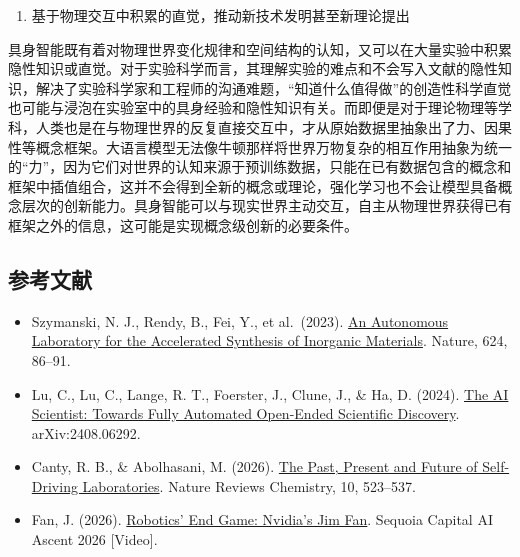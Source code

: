 \begin{enumerate}
\def\labelenumi{\arabic{enumi}.}
\setcounter{enumi}{3}
\tightlist
\item
  基于物理交互中积累的直觉，推动新技术发明甚至新理论提出
\end{enumerate}

具身智能既有着对物理世界变化规律和空间结构的认知，又可以在大量实验中积累隐性知识或直觉。对于实验科学而言，其理解实验的难点和不会写入文献的隐性知识，解决了实验科学家和工程师的沟通难题，``知道什么值得做''的创造性科学直觉也可能与浸泡在实验室中的具身经验和隐性知识有关。而即便是对于理论物理等学科，人类也是在与物理世界的反复直接交互中，才从原始数据里抽象出了力、因果性等概念框架。大语言模型无法像牛顿那样将世界万物复杂的相互作用抽象为统一的``力''，因为它们对世界的认知来源于预训练数据，只能在已有数据包含的概念和框架中插值组合，这并不会得到全新的概念或理论，强化学习也不会让模型具备概念层次的创新能力。具身智能可以与现实世界主动交互，自主从物理世界获得已有框架之外的信息，这可能是实现概念级创新的必要条件。

\hypertarget{ux53c2ux8003ux6587ux732e-167}{%
\subsection{参考文献}\label{ux53c2ux8003ux6587ux732e-167}}

\vspace{0.25em}
\begin{itemize}
\tightlist
\item
  Szymanski, N. J., Rendy, B., Fei, Y., et al.~(2023). \href{https://www.nature.com/articles/s41586-023-06734-w}{An Autonomous Laboratory for the Accelerated Synthesis of Inorganic Materials}. Nature, 624, 86--91.
\item
  Lu, C., Lu, C., Lange, R. T., Foerster, J., Clune, J., \& Ha, D. (2024). \href{https://arxiv.org/abs/2408.06292}{The AI Scientist: Towards Fully Automated Open-Ended Scientific Discovery}. arXiv:2408.06292.
\item
  Canty, R. B., \& Abolhasani, M. (2026). \href{https://www.nature.com/articles/s41570-026-00847-2}{The Past, Present and Future of Self-Driving Laboratories}. Nature Reviews Chemistry, 10, 523--537.
\item
  Fan, J. (2026). \href{https://www.youtube.com/watch?v=3Y8aq_ofEVs}{Robotics' End Game: Nvidia's Jim Fan}. Sequoia Capital AI Ascent 2026 {[}Video{]}.
\end{itemize}

\clearpage
